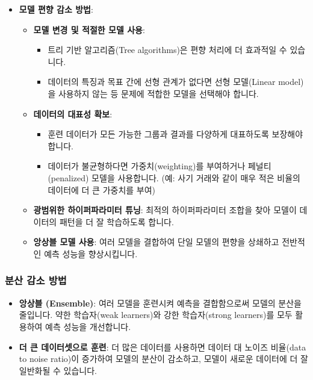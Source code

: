 \documentclass[11pt,a4paper]{article}
\theoremstyle{definition}
\begin{document}
\begin{itemize}
\begin{itemize}
\begin{itemize}
        \item \textbf{모델 편향 감소 방법}:
        \begin{itemize}
            \item \textbf{모델 변경 및 적절한 모델 사용}:
            \begin{itemize}
                \item 트리 기반 알고리즘(Tree algorithms)은 편향 처리에 더 효과적일 수 있습니다.
                \item 데이터의 특징과 목표 간에 선형 관계가 없다면 선형 모델(Linear model)을 사용하지 않는 등 문제에 적합한 모델을 선택해야 합니다.
            \end{itemize}
            \item \textbf{데이터의 대표성 확보}:
            \begin{itemize}
                \item 훈련 데이터가 모든 가능한 그룹과 결과를 다양하게 대표하도록 보장해야 합니다.
                \item 데이터가 불균형하다면 가중치(weighting)를 부여하거나 페널티(penalized) 모델을 사용합니다. (예: 사기 거래와 같이 매우 적은 비율의 데이터에 더 큰 가중치를 부여)
            \end{itemize}
            \item \textbf{광범위한 하이퍼파라미터 튜닝}: 최적의 하이퍼파라미터 조합을 찾아 모델이 데이터의 패턴을 더 잘 학습하도록 합니다.
            \item \textbf{앙상블 모델 사용}: 여러 모델을 결합하여 단일 모델의 편향을 상쇄하고 전반적인 예측 성능을 향상시킵니다.
        \end{itemize}
    \end{itemize}

    \subsubsection*{분산 감소 방법}

    \begin{itemize}
        \item \textbf{앙상블 (Ensemble)}: 여러 모델을 훈련시켜 예측을 결합함으로써 모델의 분산을 줄입니다. 약한 학습자(weak learners)와 강한 학습자(strong learners)를 모두 활용하여 예측 성능을 개선합니다.
        \item \textbf{더 큰 데이터셋으로 훈련}: 더 많은 데이터를 사용하면 데이터 대 노이즈 비율(data to noise ratio)이 증가하여 모델의 분산이 감소하고, 모델이 새로운 데이터에 더 잘 일반화될 수 있습니다.
    \end{itemize}


\end{itemize}
\end{itemize}
\end{document}
